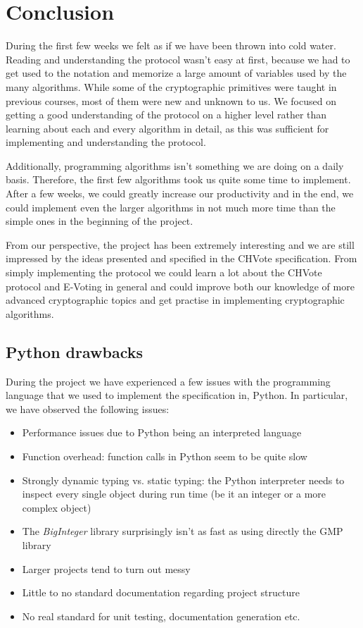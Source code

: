 \documentclass[a4paper,12pt]{report}
\begin{document}
\chapter{Conclusion}

During the first few weeks we felt as if we have been thrown into cold water. Reading and understanding the protocol wasn't easy at first, because we had to get used to the notation and memorize a large amount of variables used by the many algorithms. While some of the cryptographic primitives were taught in previous courses, most of them were new and unknown to us. We focused on getting a good understanding of the protocol on a higher level rather than learning about each and every algorithm in detail, as this was sufficient for implementing and understanding the protocol.

Additionally, programming algorithms isn't something we are doing on a daily basis. Therefore, the first few algorithms took us quite some time to implement. After a few weeks, we could greatly increase our productivity and in the end, we could implement even the larger algorithms in not much more time than the simple ones in the beginning of the project.

From our perspective, the project has been extremely interesting and we are still impressed by the ideas presented and specified in the CHVote specification. From simply implementing the protocol we could learn a lot about the CHVote protocol and E-Voting in general and could improve both our knowledge of more advanced cryptographic topics and get practise in implementing cryptographic algorithms.

\section{Python drawbacks}

During the project we have experienced a few issues with the programming language that we used to implement the specification in, Python. In particular, we have observed the following issues:

\begin{itemize}
	\item Performance issues due to Python being an interpreted language
	\item Function overhead: function calls in Python seem to be quite slow
	\item Strongly dynamic typing vs. static typing: the Python interpreter needs to inspect every single object during run time (be it an integer or a more complex object)
	\item The \textit{BigInteger} library surprisingly isn't as fast as using directly the GMP library
	\item Larger projects tend to turn out messy
	\item Little to no standard documentation regarding project structure
	\item No real standard for unit testing, documentation generation etc.
\end{itemize}
\end{document}
